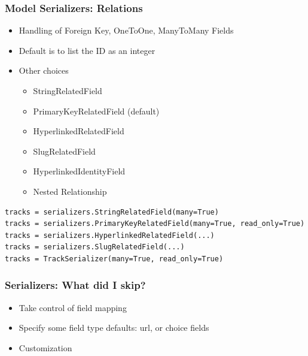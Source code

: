 \documentclass{beamer}
\begin{document}
\begin{frame}[fragile]

  \frametitle{Model Serializers: Relations}

\begin{itemize}
	\item Handling of Foreign Key, OneToOne, ManyToMany Fields
	\item Default is to list the ID as an integer
	\item Other choices
		\begin{itemize}
		\item StringRelatedField
		\item<2-> PrimaryKeyRelatedField (default)
		\item<3-> HyperlinkedRelatedField
		\item<4-> SlugRelatedField
		\item<5-> HyperlinkedIdentityField
		\item<6-> Nested  Relationship
		\end{itemize}
\end{itemize}

\begin{lstlisting}
tracks = serializers.StringRelatedField(many=True)
tracks = serializers.PrimaryKeyRelatedField(many=True, read_only=True)
tracks = serializers.HyperlinkedRelatedField(...)
tracks = serializers.SlugRelatedField(...)
tracks = TrackSerializer(many=True, read_only=True)
\end{lstlisting}

\end{frame}

\begin{frame}[fragile]

  \frametitle{Serializers: What did I skip?}

\begin{itemize}
	\item Take control of field mapping
	\item Specify some field type defaults: url, or choice fields
	\item Customization
	
\end{itemize}

\end{frame}
\end{document}
